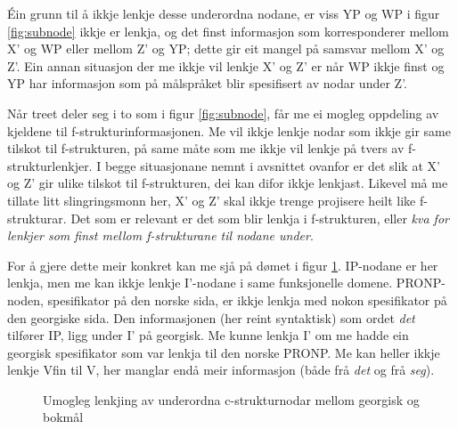 \documentclass[11pt,a4paper,oneside,draft]{book}
\begin{document}
Éin grunn til å ikkje lenkje desse underordna nodane, er viss YP og WP
i figur \ref{fig:subnode} ikkje er lenkja, og det finst informasjon
som korresponderer mellom X' og WP eller mellom Z' og YP; dette gir
eit mangel på samsvar mellom X' og Z'.  Ein annan situasjon der me
ikkje vil lenkje X' og Z' er når WP ikkje finst og YP har informasjon
som på målspråket blir spesifisert av nodar under Z'.

Når treet deler seg i to som i figur \ref{fig:subnode}, får me ei
mogleg oppdeling av kjeldene til f-strukturinformasjonen. Me vil ikkje
lenkje nodar som ikkje gir same tilskot til f-strukturen, på same måte
som me ikkje vil lenkje på tvers av f-strukturlenkjer. I begge
situasjonane nemnt i avsnittet ovanfor er det slik at X' og Z' gir
ulike tilskot til f-strukturen, dei kan difor ikkje lenkjast. Likevel
må me tillate litt slingringsmonn her, X' og Z' skal ikkje trenge
projisere heilt like f-strukturar. Det som er relevant er det som blir
lenkja i f-strukturen, eller \emph{kva for lenkjer som finst mellom f-strukturane til nodane under}.

For å gjere dette meir konkret kan me sjå på dømet i figur
\ref{fig:ikkjesub}. IP-nodane er her lenkja, men me kan ikkje lenkje
I'-nodane i same funksjonelle domene. PRONP-noden, spesifikator på den
norske sida, er ikkje lenkja med nokon spesifikator på den georgiske
sida. Den informasjonen (her reint syntaktisk) som ordet \emph{det}
tilfører IP, ligg under I' på georgisk. Me kunne lenkja I' om me hadde
ein georgisk spesifikator som var lenkja til den norske PRONP. Me kan
heller ikkje lenkje Vfin til V, her manglar endå meir informasjon
(både frå \emph{det} og frå \emph{seg}). 

\begin{figure}[htp]
\centering
{}


\caption{Umogleg lenkjing av underordna c-strukturnodar mellom georgisk og bokmål}
 \label{fig:ikkjesub}
\end{figure}
\end{document}
